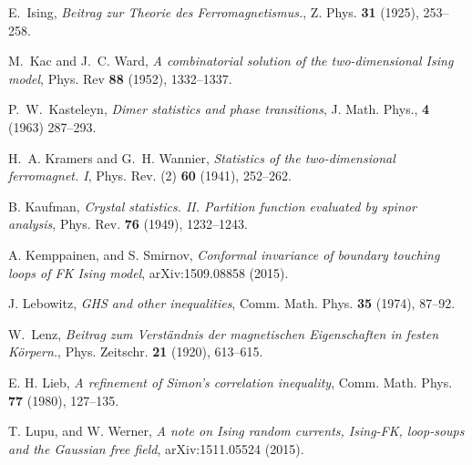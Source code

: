\documentclass[a4paper,oneside,11pt]{article}
\begin{document}
\begin{thebibliography}{7}
  


E.~Ising, \emph{Beitrag zur {T}heorie des {F}erromagnetismus.}, Z. Phys.
  \textbf{31} (1925), 253--258.


M.~Kac and J.~C. Ward, \emph{A combinatorial solution of the two-dimensional
  {I}sing model}, Phys. Rev \textbf{88} (1952), 1332--1337.
  
P.~W.~Kasteleyn, {\em Dimer statistics and phase transitions}, J. Math. Phys., {\bf 4} (1963) 287--293.

H.~A. Kramers and G.~H. Wannier, \emph{Statistics of the two-dimensional
  ferromagnet. {I}}, Phys. Rev. (2) \textbf{60} (1941), 252--262.

B. Kaufman,
{\em Crystal statistics. II. Partition function evaluated by spinor analysis},
Phys. Rev.
{\bf 76} (1949), 1232--1243.

A. Kemppainen, and S. Smirnov, {\em 
    Conformal invariance of boundary touching loops of FK Ising model},  arXiv:1509.08858 (2015).
      
J. Lebowitz, {\em G{HS} and other inequalities},  Comm. Math. Phys. \textbf{35}
  (1974), 87--92.

W.~Lenz, \emph{Beitrag zum {V}erst\"andnis der magnetischen {E}igenschaften in
  festen {K}\"orpern.}, Phys. Zeitschr. \textbf{21} (1920), 613--615.

E. H. Lieb, {\em A refinement of Simon's correlation inequality}, Comm. Math. Phys.
 {\bf 77} (1980),
 127--135.


T. Lupu, and W. Werner, {\em A note on Ising random currents, Ising-FK, loop-soups and the Gaussian free field},
 {arXiv:1511.05524} (2015).
 

\end{thebibliography}
\end{document}
